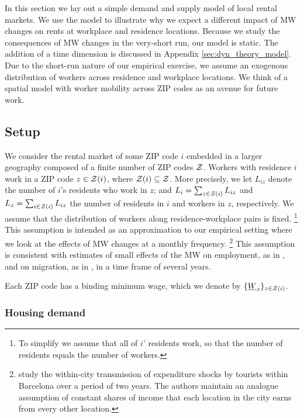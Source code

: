 
In this section we lay out a simple demand and supply model of local rental markets.
We use the model to illustrate why we expect a different impact of MW changes 
on rents at workplace and residence locations.
Because we study the consequences of MW changes in the very-short run, our model 
is static.
The addition of a time dimension is discussed in Appendix 
\ref{sec:dyn_theory_model}.
Due to the short-run nature of our empirical exercise, we assume an exogenous 
distribution of workers across residence and workplace locations.
We think of a spatial model with worker mobility across ZIP codes as an avenue 
for future work.

\subsection{Setup}

We consider the rental market of some ZIP code $i$ embedded in a larger geography 
composed of a finite number of ZIP codes $\mathcal{Z}$.
Workers with residence $i$ work in a ZIP code $z\in\mathcal{Z}(i)$, where 
$\mathcal{Z}(i)\subseteq\mathcal{Z}$.
More precisely, we let $L_{iz}$ denote the number of $i$'s residents who work 
in $z$; and 
$L_i = \sum_{z \in \mathcal{Z}(i)} L_{iz}$ and $L_z = \sum_{i \in \mathcal{Z}(i)} L_{iz}$ the 
number of residents in $i$ and workers in $z$, respectively.
We assume that the distribution of workers along residence-workplace pairs is 
fixed.%
\footnote{To simplify we assume that all of $i$' residents work, so that the 
number of residents equals the number of workers.}
This assumption is intended as an approximation to our empirical setting where 
we look at the effects of MW changes at a monthly frequency.%
\footnote{\textcite{AllenEtAl2020} study the within-city transmission of 
expenditure shocks by tourists within Barcelona over a period of two years.
The authors maintain an analogue assumption of constant shares of income that
each location in the city earns from every other location.}
This assumption is consistent with estimates of small effects of the MW on 
employment, as in \textcite{CegnizEtAl2019, DustmannEtAl2022}, and 
on migration, as in \textcite{PerezPerez2021}, 
in a time frame of several years.

Each ZIP code has a binding minimum wage, which we denote by 
$\{\underline{W}_z\}_{z\in\mathcal{Z}(i)}$.

\subsubsection*{Housing demand}

